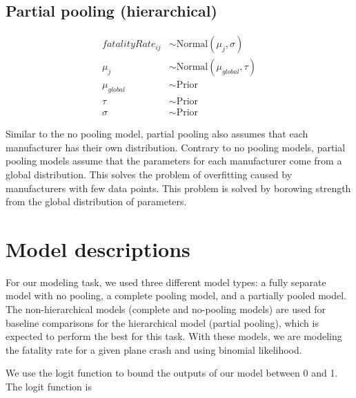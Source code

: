 \documentclass[12pt,a4paper]{article}
\begin{document}
\subsection{Partial pooling (hierarchical)}


\begin{align*}
  fatalityRate_{ij} & \sim \text{Normal}(\mu_j, \sigma)      \\
  \mu_j             & \sim \text{Normal}(\mu_{global}, \tau) \\
  \mu_{global}      & \sim \text{Prior}                      \\
  \tau              & \sim \text{Prior}                      \\
  \sigma            & \sim \text{Prior}
\end{align*}

Similar to the no pooling model, partial pooling also assumes that each manufacturer has their own distribution. Contrary to no pooling models, partial pooling models assume that the parameters for each manufacturer come from a global distribution. This solves the problem of overfitting caused by manufacturers with few data points. This problem is solved by borowing strength from the global distribution of parameters.


\section{Model descriptions}
For our modeling task, we used three different model types: a fully separate model with no pooling, a complete pooling model, and a partially pooled model. The non-hierarchical models (complete and no-pooling models) are used for baseline comparisons for the hierarchical model (partial pooling), which is expected to perform the best for this task. With these models, we are modeling the fatality rate for a given plane crash and using binomial likelihood.

We use the logit function to bound the outputs of our model between 0 and 1. The logit function is
\end{document}
